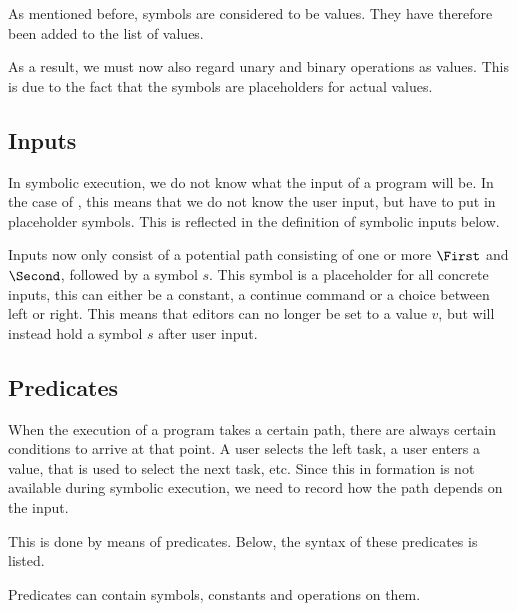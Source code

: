 As mentioned before, symbols are considered to be values.
They have therefore been added to the list of values.


As a result, we must now also regard unary and binary operations as values.
This is due to the fact that the symbols are placeholders for actual values.



\subsection{Inputs}

In symbolic execution, we do not know what the input of a program will be.
In the case of \TOPHAT, this means that we do not know the user input, but have to put in placeholder symbols.
This is reflected in the definition of symbolic inputs below.


Inputs now only consist of a potential path consisting of one or more $\First$ and $\Second$,
followed by a symbol $s$.
This symbol is a placeholder for all concrete inputs, this can either be a constant, a continue command or a choice between left or right.
This means that editors can no longer be set to a value $v$, but will instead hold a symbol $s$ after user input.


\subsection{Predicates}

When the execution of a \TOPHAT program takes a certain path, there are always certain conditions to arrive at that point.
A user selects the left task, a user enters a value, that is used to select the next task, etc.
Since this in formation is not available during symbolic execution, we need to record how the path depends on the input.

This is done by means of predicates.
Below, the syntax of these predicates is listed.

Predicates can contain symbols, constants and operations on them.
